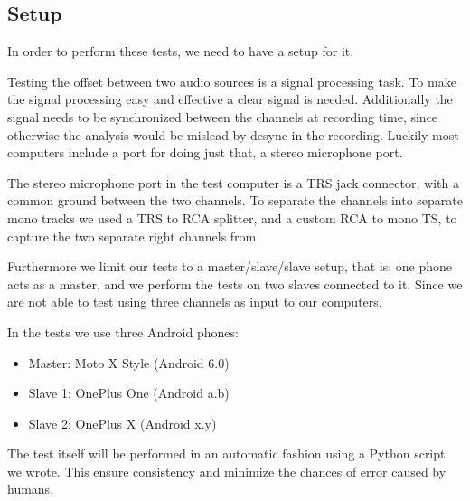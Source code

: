\subsection{Setup}
In order to perform these tests, we need to have a setup for it. 

Testing the offset between two audio sources is a signal processing
task. To make the signal processing easy and effective a clear signal is
needed. Additionally the signal needs to be synchronized between the
channels at recording time, since otherwise the analysis would be
mislead by desync in the recording. Luckily most computers include
a port for doing just that, a stereo microphone port.

The stereo microphone port in the test computer is a \ac{TRS} jack
connector, with a common ground between the two channels. To separate
the channels into separate mono tracks we used a \ac{TRS} to \ac{RCA}
splitter, and a custom \ac{RCA} to mono \ac{TS}, to capture the two
separate right channels from

Furthermore we limit our tests to a master/slave/slave setup, 
that is; one phone acts as a master, and we perform the tests 
on two slaves connected to it. Since we are not able to test
using three channels as input to our computers. 

In the tests we use three Android phones:
\begin{itemize}
	\item Master: Moto X Style (Android 6.0)
	\item Slave 1: OnePlus One (Android a.b)
	\item Slave 2: OnePlus X (Android x.y)
\end{itemize}

The test itself will be performed in an automatic fashion using a Python script we wrote.
This ensure consistency and minimize the chances of error caused by humans.
